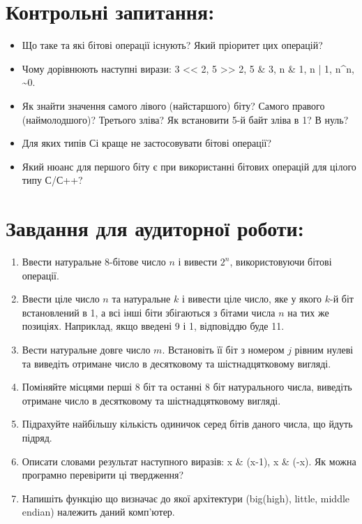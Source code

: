 \documentclass[a5paper,titlepage,openany,twoside,draft]{book_unv}%
\begin{document}
\section{Контрольні запитання:}
\begin{itemize}
\item
  Що таке та які бітові операції існують? Який пріоритет цих операцій?
\item
  Чому дорівнюють наступні вирази:
  3 \textless{}\textless{} 2, 5 \textgreater{}\textgreater{} 2, 5 \& 3, 
n \& 1, n | 1, n\textasciicircum{}n, \textasciitilde{}0.
\item
  Як знайти значення самого лівого (найстаршого) біту? 
Самого правого (наймолодшого)? Третього зліва?
  Як встановити 5-й байт зліва в 1? В нуль?
\item
  Для яких типів Сі краще не застосовувати бітові операції?
\item
  Який нюанс для першого біту є при використанні бітових операцій для
  цілого типу С/С++?
\end{itemize}

\section{Завдання для аудиторної роботи:}

\begin{enumerate}
\def\labelenumi{\arabic{enumi})}
\item
  Ввести натуральне 8-бітове число $n$ і вивести $2^{n}$, використовуючи бітові операції.
\item
  Ввести ціле число $n$ та натуральне $k$ і вивести ціле число, яке у якого
  $k$-й біт встановлений в 1, а всі інші біти збігаються з бітами числа $n$
  на тих же позиціях. Наприклад, якщо введені 9 і 1, відповіддю буде 11.
\item
  Вести натуральне довге число $m$. Встановіть її біт
  з номером $j$ рівним нулеві та виведіть отримане число в десятковому та
  шістнадцятковому вигляді.
\item
  Поміняйте місцями перші 8 біт та останні 8 біт натурального числа,
  виведіть отримане число в десятковому та шістнадцятковому вигляді.
\item
  Підрахуйте найбільшу кількість одиничок серед бітів даного числа, що
  йдуть підряд.
\item
  Описати словами результат наступного виразів: x \& (x-1), x \& (-x). 
Як можна програмно перевірити ці твердження?
\item
  Напишіть функцію що визначає до якої архітектури (big(high), little, middle
  endian) належить даний комп'ютер.
\end{enumerate}
\end{document}
